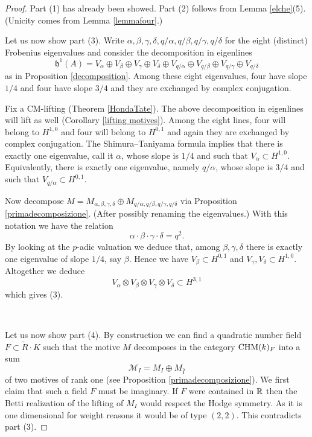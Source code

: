 \begin{proof}
Part (1) has already been showed. Part (2) follows from Lemma \ref{elche}(5). (Unicity comes from Lemma \ref{lemmafour}.)

Let us now show part (3). Write $\alpha, \beta, \gamma, \delta, q/\alpha, q/\beta, q/\gamma, q/ \delta $ for the eight (distinct) Frobenius eigenvalues and consider the decomposition in eigenlines
\[\mathfrak{h}^1(A)=V_\alpha \oplus V_\beta \oplus V_\gamma \oplus V_\delta \oplus V_{q/\alpha} \oplus V_{q/\beta} \oplus V_{q/\gamma} \oplus V_{q/ \delta} \]
as in Proposition \ref{decomposition}. Among these eight eigenvalues, four have slope $1/4$ and four have slope $3/4$ and they are exchanged by complex conjugation.

Fix a CM-lifting (Theorem \ref{HondaTate}). The above decomposition in eigenlines will lift as well (Corollary \ref{lifting motives}). Among the eight lines, four will belong to $H^{1,0}$ and four will belong to $H^{0,1}$ and again they are exchanged by complex conjugation. The Shimura--Taniyama  formula  \cite[Lemma 5]{TateBour}  implies that there is exactly one eigenvalue, call it $\alpha$, whose slope is $1/4$ and such that
$V_\alpha \subset H^{1,0}$. Equivalently,  there is exactly one eigenvalue, namely $q/\alpha$, whose slope is $3/4$ and such that
$V_{q/\alpha} \subset H^{0,1}$.

Now decompose $M= M_{\alpha, \beta, \gamma, \delta} \oplus M_{q/\alpha, q/\beta, q/\gamma, q/ \delta}$ via Proposition \ref{primadecomposizione}. (After possibly renaming the eigenvalues.)
With this notation we have the relation
\[\alpha\cdot \beta \cdot \gamma \cdot \delta=q^2.\]
By looking at the $p$-adic valuation we deduce that, among $\beta, \gamma, \delta$ there is exactly one eigenvalue of slope $1/4$, say $\beta$.  Hence  we have $V_\beta \subset H^{0,1}$ and  $V_\gamma, V_\delta \subset H^{1,0}$. Altogether we deduce
\[V_\alpha \otimes V_\beta \otimes V_\gamma \otimes V_\delta \subset H^{3,1}\]
which gives (3).

\

Let us now show part (4). By construction we can find a quadratic number field $F\subset \tilde{R}\cdot K$   such that the motive $M$  decomposes in the category $\mathrm{CHM} (k)_{F}$ into a sum
\[\mathcal{M}_{I} = M_{I} \oplus  M_{\bar{I}}  \] of two motives of rank one (see Proposition \ref{primadecomposizione}). We first claim that such a field $F$ must be imaginary. If $F$ were contained in $\mathbb{R}$ then the Betti realization of the lifting of $M_{I}$ would respect the Hodge symmetry. As it is one dimensional for weight reasons it would be of type $(2,2)$. This contradicts part (3).


\end{proof}
